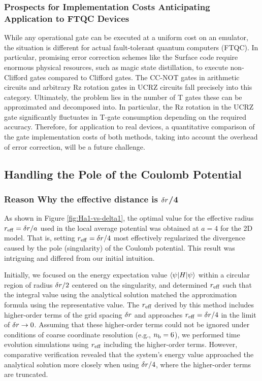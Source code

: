 \documentclass[jctc-draft.tex]{subfiles}
\begin{document}
\subsubsection{Prospects for Implementation Costs Anticipating Application to FTQC Devices}
While any operational gate can be executed at a uniform cost on an emulator, the
situation is different for actual fault-tolerant quantum computers (FTQC). In
particular, promising error correction schemes like the Surface code require
enormous physical resources, such as magic state distillation, to execute
non-Clifford gates compared to Clifford gates. The CC-NOT gates in arithmetic
circuits and arbitrary Rz rotation gates in UCRZ circuits fall precisely into
this category. Ultimately, the problem lies in the number of T gates these can
be approximated and decomposed into. In particular, the Rz rotation in the UCRZ
gate significantly fluctuates in T-gate consumption depending on the required
accuracy. Therefore, for application to real devices, a quantitative comparison
of the gate implementation costs of both methods, taking into account the
overhead of error correction, will be a future challenge.

\subsection{Handling the Pole of the Coulomb Potential}
\label{sec:coulomb-potential-handling-analysis}
\subsubsection{Reason Why the effective distance is $\delta r$/4}
As shown in Figure \ref{fig:Ha1-vs-delta1}, the optimal value for the effective
radius $r_{\mathrm{eff}}=\delta r/a$ used in the local average potential was obtained at
$a=4$ for the 2D model. That is, setting $r_{\mathrm{eff}}=\delta r/4$ most effectively
regularized the divergence caused by the pole (singularity) of the Coulomb
potential. This result was intriguing and differed from our initial intuition.

Initially, we focused on the energy expectation value $\braket{\psi|H|\psi}$
within a circular region of radius $\delta r/2$ centered on the singularity, and
determined $r_{\mathrm{eff}}$ such that the integral value using the analytical solution
matched the approximation formula using the representative value. The $r_{\mathrm{eff}}$
derived by this method includes higher-order terms of the grid spacing $\delta r$
and approaches $r_{\mathrm{eff}}=\delta r/4$ in the limit of $\delta r\rightarrow0$. Assuming
that these higher-order terms could not be ignored under conditions of coarse
coordinate resolution (e.g., $n_{\mathrm{b}}=6$), we performed time evolution simulations
using $r_{\mathrm{eff}}$ including the higher-order terms. However, comparative
verification revealed that the system's energy value approached the analytical
solution more closely when using $\delta r/4$, where the higher-order terms are
truncated.
\end{document}
